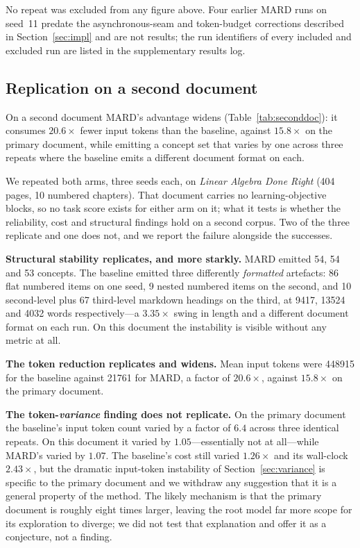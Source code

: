 \documentclass[conference]{IEEEtran}
\begin{document}
No repeat was excluded from any figure above. Four earlier MARD runs on
seed~11 predate the asynchronous-seam and token-budget corrections described
in Section~\ref{sec:impl} and are not results; the run identifiers
of every included and excluded run are listed in the supplementary results
log.

\subsection{Replication on a second document}
\label{sec:secondoc}
On a second document MARD's advantage widens (Table~\ref{tab:seconddoc}): it
consumes $20.6\times$ fewer input tokens than the baseline, against
$15.8\times$ on the primary document,
while emitting a concept set that varies by one across three repeats where the
baseline emits a different document format on each.

We repeated both arms, three seeds each, on \emph{Linear Algebra Done Right}
(404 pages, 10 numbered chapters). That document carries no learning-objective
blocks, so no task score exists for either arm on it; what it tests is whether
the reliability, cost and structural findings hold on a second corpus. Two of
the three replicate and one does not, and we report the failure alongside the
successes.

\textbf{Structural stability replicates, and more starkly.} MARD emitted
\num{54}, \num{54} and \num{53} concepts. The baseline emitted three
differently \emph{formatted} artefacts: \num{86} flat numbered items on one
seed, \num{9} nested numbered items on the second, and \num{10} second-level
plus \num{67} third-level markdown headings on the third, at \num{9417},
\num{13524} and \num{4032} words respectively---a $3.35\times$ swing in length
and a different document format on each run. On this document the instability
is visible without any metric at all.

\textbf{The token reduction replicates and widens.} Mean input tokens were
\num{448915} for the baseline against \num{21761} for MARD, a factor of
$20.6\times$, against $15.8\times$ on the primary document.

\textbf{The token-\emph{variance} finding does not replicate.} On the primary
document the baseline's input token count varied by a factor of $6.4$ across
three identical repeats. On this document it varied by $1.05$---essentially
not at all---while MARD's varied by $1.07$. The baseline's cost still varied
$1.26\times$ and its wall-clock $2.43\times$, but the dramatic input-token
instability of Section~\ref{sec:variance} is specific to the primary document
and we withdraw any suggestion that it is a general property of the method.
The likely mechanism is that the primary document is roughly eight times
larger, leaving the root model far more scope for its exploration to diverge;
we did not test that explanation and offer it as a conjecture, not a finding.
\end{document}
